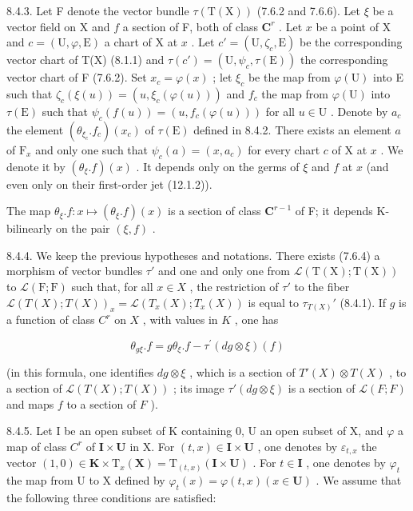 8.4.3. Let F denote the vector bundle \(\tau(\mathrm{T}(\mathrm{X}))\) (7.6.2 and 7.6.6). Let \(\xi\) be a vector field on X and \(f\) a section of F, both of class \(\mathbf{C}^r\) . Let \(x\) be a point of X and \(c = (\mathrm{U}, \varphi, \mathrm{E})\) a chart of X at \(x\) . Let \(c' = (\mathrm{U}, \zeta_c, \mathrm{E})\) be the corresponding vector chart of T(X) (8.1.1) and \(\tau(c') = (\mathrm{U}, \psi_c, \tau(\mathrm{E}))\) the corresponding vector chart of F (7.6.2). Set \(x_c = \varphi(x)\) ; let \(\xi_c\) be the map from \(\varphi(\mathrm{U})\) into E such that \(\zeta_c(\xi(u)) = (u, \xi_c(\varphi(u)))\) and \(f_c\) the map from \(\varphi(\mathrm{U})\) into \(\tau(\mathrm{E})\) such that \(\psi_c(f(u)) = (u, f_c(\varphi(u)))\) for all \(u \in \mathrm{U}\) . Denote by \(a_c\) the element \((\theta_{\xi_c}.f_c)(x_c)\) of \(\tau(\mathrm{E})\) defined in 8.4.2. There exists an element \(a\) of \(\mathrm{F}_x\) and only one such that \(\psi_c(a) = (x, a_c)\) for every chart \(c\) of X at \(x\) . We denote it by \((\theta_\xi.f)(x)\) . It depends only on the germs of \(\xi\) and \(f\) at \(x\) (and even only on their first-order jet (12.1.2)).

The map \(\theta_{\xi}.f: x \mapsto (\theta_{\xi}.f)(x)\) is a section of class \(\mathbf{C}^{r-1}\) of F; it depends K-bilinearly on the pair \((\xi, f)\) .

8.4.4. We keep the previous hypotheses and notations. There exists (7.6.4) a morphism of vector bundles \(\tau'\) and one and only one from \(\mathcal{L}(\mathrm{T}(\mathrm{X});\mathrm{T}(\mathrm{X}))\) to \(\mathcal{L}(\mathrm{F};\mathrm{F})\) such that, for all \(x \in X\) , the restriction of \(\tau'\) to the fiber \(\mathcal{L}(T(X); T(X))_x = \mathcal{L}(T_x(X); T_x(X))\) is equal to \(\tau_{T(X)}'\) (8.4.1). If \(g\) is a function of class \(C^r\) on \(X\) , with values in \(K\) , one has

\[
\theta_ {g \xi}. f = g \theta_ {\xi}. f - \tau^ {\prime} (d g \otimes \xi) (f)
\]

(in this formula, one identifies \(dg \otimes \xi\) , which is a section of \(T'(X) \otimes T(X)\) , to a section of \(\mathcal{L}(T(X); T(X))\) ; its image \(\tau'(dg \otimes \xi)\) is a section of \(\mathcal{L}(F; F)\) and maps \(f\) to a section of \(F\) ).

8.4.5. Let I be an open subset of K containing 0, U an open subset of X, and \(\varphi\) a map of class \(C^r\) of \(\mathbf{I} \times \mathbf{U}\) in X. For \((t, x) \in \mathbf{I} \times \mathbf{U}\) , one denotes by \(\varepsilon_{t,x}\) the vector \((1, 0) \in \mathbf{K} \times \mathrm{T}_x(\mathbf{X}) = \mathrm{T}_{(t,x)}(\mathbf{I} \times \mathbf{U})\) . For \(t \in \mathbf{I}\) , one denotes by \(\varphi_t\) the map from U to X defined by \(\varphi_t(x) = \varphi(t, x) (x \in \mathbf{U})\) . We assume that the following three conditions are satisfied:

